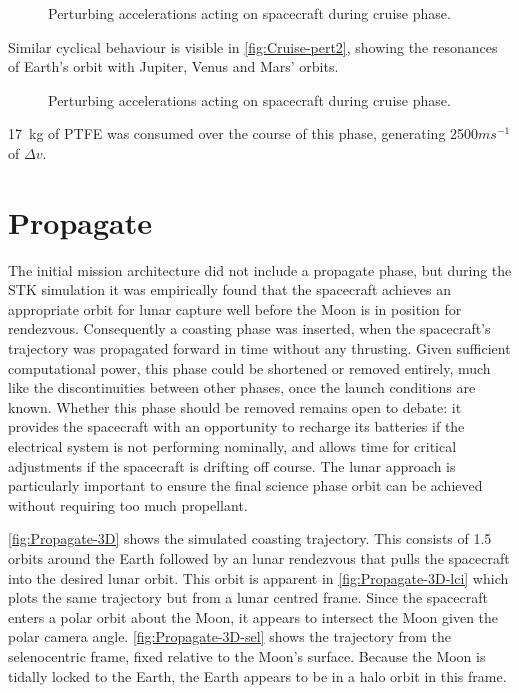 \begin{figure}
\centering
\def\svgwidth{\figurewidth}

\caption{Perturbing accelerations acting on spacecraft during cruise phase.}
\label{fig:Cruise-pert}
\end{figure}

Similar cyclical behaviour is visible in \autoref{fig:Cruise-pert2}, showing the resonances of Earth's orbit with Jupiter, Venus and Mars' orbits.

\begin{figure}
\centering
\def\svgwidth{\figurewidth}

\caption{Perturbing accelerations acting on spacecraft during cruise phase.}
\label{fig:Cruise-pert2}
\end{figure}

17~kg of PTFE was consumed over the course of this phase, generating 2500$ms^{-1}$ of $\Delta v$. %


\clearpage 

\section{Propagate}

The initial mission architecture did not include a propagate phase, but during the STK simulation it was empirically found that the spacecraft achieves an appropriate orbit for lunar capture well before the Moon is in position for rendezvous. Consequently a coasting phase was inserted, when the spacecraft's trajectory was propagated forward in time without any thrusting. Given sufficient computational power, this phase could be shortened or removed entirely, much like the discontinuities between other phases, once the launch conditions are known. Whether this phase should be removed remains open to debate: it provides the spacecraft with an opportunity to recharge its batteries if the electrical system is not performing nominally, and allows time for critical adjustments if the spacecraft is drifting off course. The lunar approach is particularly important to ensure the final science phase orbit can be achieved without requiring too much propellant.

\autoref{fig:Propagate-3D} shows the simulated coasting trajectory. This consists of 1.5 orbits around the Earth followed by an lunar rendezvous that pulls the spacecraft into the desired lunar orbit. This orbit is apparent in \autoref{fig:Propagate-3D-lci} which plots the same trajectory but from a lunar centred frame. Since the spacecraft enters a polar orbit about the Moon, it appears to intersect the Moon given the polar camera angle. \autoref{fig:Propagate-3D-sel} shows the trajectory from the selenocentric frame, fixed relative to the Moon's surface. Because the Moon is tidally locked to the Earth, the Earth appears to be in a halo orbit in this frame.

